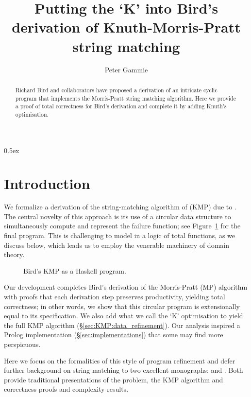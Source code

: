 \documentclass[11pt,a4paper]{article}
\begin{document}
\parindent 0pt\parskip 0.5ex

\title{Putting the `K' into Bird's derivation of Knuth-Morris-Pratt string matching}
\author{Peter Gammie}
\maketitle

\begin{abstract}
  \noindent Richard Bird and collaborators have proposed a derivation
  of an intricate cyclic program that implements the Morris-Pratt
  string matching algorithm. Here we provide a proof of total
  correctness for Bird's derivation and complete it by adding Knuth's
  optimisation.
\end{abstract}


\tableofcontents


\section{Introduction\label{sec:introduction}}

We formalize a derivation of the string-matching algorithm of
\citet{KnuthMorrisPratt:1977} (KMP) due to
\citet[Chapter~17]{Bird:PearlsofFAD:2010}. The central novelty of this
approach is its use of a circular data structure to simultaneously
compute and represent the failure function; see
Figure~\ref{fig:haskell-kmp} for the final program. This is
challenging to model in a logic of total functions, as we discuss
below, which leads us to employ the venerable machinery of domain
theory.

\begin{figure}
  \caption{Bird's KMP as a Haskell program.}
  \label{fig:haskell-kmp}
\end{figure}

Our development completes Bird's derivation of the Morris-Pratt (MP)
algorithm with proofs that each derivation step preserves
productivity, yielding total correctness; in other words, we show that
this circular program is extensionally equal to its specification. We
also add what we call the `K' optimisation to yield the full KMP
algorithm (\S\ref{sec:KMP:data_refinement}). Our analysis inspired a
Prolog implementation (\S\ref{sec:implementations}) that some may find
more perspicuous.

Here we focus on the formalities of this style of program refinement
and defer further background on string matching to two excellent
monographs: \citet[\S2.3]{Gusfield:1997} and
\citet[\S2.1]{CrochemoreRytter:2002}. Both provide traditional
presentations of the problem, the KMP algorithm and correctness proofs
and complexity results.
\end{document}
